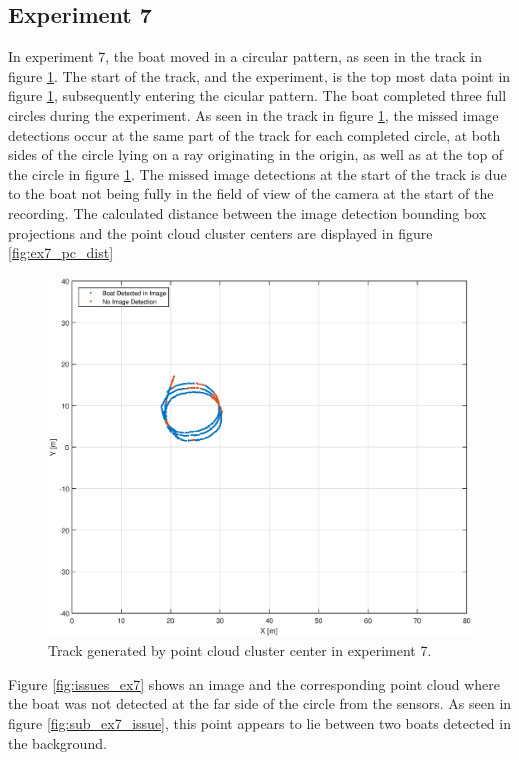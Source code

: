 \subsection{Experiment 7}
In experiment 7, the boat moved in a circular pattern, as seen in the track in figure \ref{fig:ex7_track}. The start of the track, and the experiment, is the top most data point in figure \ref{fig:ex7_track}, subsequently entering the cicular pattern. The boat completed three full circles during the experiment. As seen in the track in figure \ref{fig:ex7_track}, the missed image detections occur at the same part of the track for each completed circle, at both sides of the circle lying on a ray originating in the origin, as well as at the top of the circle in figure \ref{fig:ex7_track}. The missed image detections at the start of the track is due to the boat not being fully in the field of view of the camera at the start of the recording. The calculated distance between the image detection bounding box projections and the point cloud cluster centers are displayed in figure \ref{fig:ex7_pc_dist}
\begin{figure}[H]
	\centering
	\includegraphics[width=.8\linewidth]{fig/exp_7_track.eps}
	\caption{Track generated by point cloud cluster center in experiment 7.}
	\label{fig:ex7_track}
\end{figure}
Figure \ref{fig:issues_ex7} shows an image and the corresponding point cloud where the boat was not detected at the far side of the circle from the sensors. As seen in figure \ref{fig:sub_ex7_issue}, this point appears to lie between two boats detected in the background.
